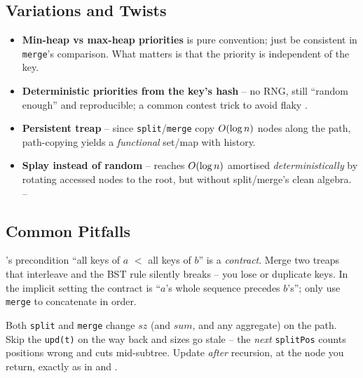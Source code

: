 \subsection{Variations and Twists}

\begin{itemize}[nosep, leftmargin=1.4em]
  \item \textbf{Min-heap vs max-heap priorities} is pure convention; just be consistent in
        \texttt{merge}'s comparison. What matters is that the priority is independent of the key. \hfill{}
  \item \textbf{Deterministic priorities from the key's hash} -- no RNG, still ``random enough'' and
        reproducible; a common contest trick to avoid flaky . \hfill{}
  \item \textbf{Persistent treap} -- since \texttt{split}/\texttt{merge} copy $O(\log n)$ nodes along
        the path, path-copying yields a \emph{functional} set/map with history. \hfill{}
  \item \textbf{Splay instead of random} --  reaches $O(\log n)$ amortised
        \emph{deterministically} by rotating accessed nodes to the root, but without split/merge's clean
        algebra. \hfill{}--
\end{itemize}

\subsection{Common Pitfalls}\label{sec:c06-treaps-pitfalls}

\begin{warningbox}
's precondition ``all keys of $a$ $<$ all keys of $b$'' is a \emph{contract}. Merge
two treaps that interleave and the BST rule silently breaks -- you lose or duplicate keys. In the implicit
setting the contract is ``$a$'s whole sequence precedes $b$'s''; only use \texttt{merge} to concatenate in
order.
\end{warningbox}

\begin{warningbox}
Both \texttt{split} and \texttt{merge} change $\mathit{sz}$ (and $\mathit{sum}$, and any aggregate) on the
path. Skip the \texttt{upd(t)} on the way back and sizes go stale -- the \emph{next} \texttt{splitPos}
counts positions wrong and cuts mid-subtree. Update \emph{after} recursion, at the node you return, exactly
as in  and .
\end{warningbox}

